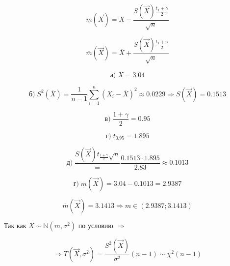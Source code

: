 \documentclass[12pt, a4paper]{report}
\begin{document}
	\begin{equation*}
	\underline{m} (\vec{X}) = \overline{X} - \frac{S(\vec{X}) \frac{t_1+ \gamma}{2}}{\sqrt{n}}
	\end{equation*}
	
	\begin{equation*}
	\overline{m} (\vec{X}) = \overline{X} + \frac{S(\vec{X}) \frac{t_1+ \gamma}{2}}{\sqrt{n}}
	\end{equation*}
	
	\vspace{0.5cm}
	
	\begin{equation*}
	\textbf{а)}\; \overline{X} = 3.04
	\end{equation*}
	
	\begin{equation*}
	\textbf{б)}\; S^2(\overline{X}) = \frac{1}{n-1} \sum_{i=1}^{n}(X_i - \overline{X})^2 \approx 0.0229 \Rightarrow S(\vec{X}) = 0.1513
	\end{equation*}
	
	\begin{equation*}
	\textbf{в)}\; \frac{1+\gamma}{2} = 0.95
	\end{equation*}
	
	\begin{equation*}
	\textbf{г)}\; t_{0.95} = 1.895
	\end{equation*}
	
	\begin{equation*}
	\textbf{д)}\; \frac{S(\vec{X}) t_{\frac{1 + \gamma}{2}}{\sqrt{n}}} = \frac{0.1513  \cdot  1.895}{2.83} \approx 0.1013
	\end{equation*}
	
	\begin{equation*}
	\textbf{г)}\; \underline{m} (\vec{X}) = 3.04 - 0.1013 = 2.9387
	\end{equation*}
	
	\begin{equation*}
	\overline{m} (\vec{X}) = 3.1413 \Rightarrow m \in (2.9387; 3.1413)
	\end{equation*}
	
	 \vspace{0.5cm} Так как $X \sim \mathbb{N}(m, \sigma^2)$ по условию $\Rightarrow$
	 
	 \begin{equation*}
	 \Rightarrow T(\vec{X}, \sigma^2) =  \frac{S^2(\vec{X})}{\sigma^2} (n-1) \sim \chi^2(n-1) 
	 \end{equation*}
	 
\end{document}
